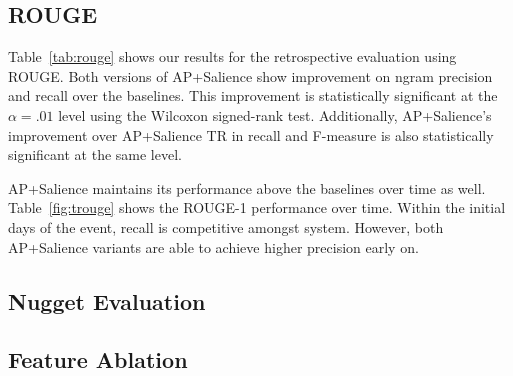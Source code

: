 \subsection{ROUGE}

Table~\ref{tab:rouge} shows our results for the retrospective evaluation using ROUGE. 
Both versions of AP+Salience show improvement on ngram precision and recall over the 
baselines. This improvement is statistically significant at the $\alpha = .01$ level
using the Wilcoxon signed-rank test. Additionally, AP+Salience's improvement over
AP+Salience TR in recall and F-measure is also statistically significant at the same level.

AP+Salience maintains its performance above the baselines over time as well. Table~\ref{fig:trouge}
shows the ROUGE-1 performance over time. Within the initial days of the event, recall is 
competitive amongst system. However, both AP+Salience variants are able to achieve higher
precision early on.  

\subsection{Nugget Evaluation}

\subsection{Feature Ablation}


